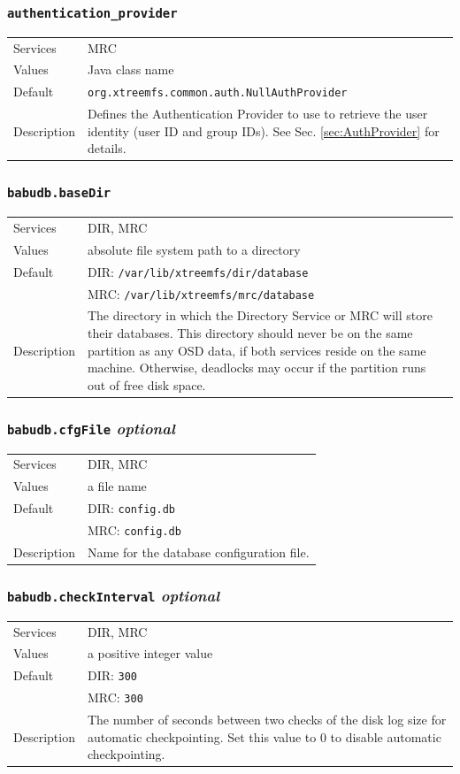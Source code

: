 \documentclass[a4paper,10pt]{book}
\begin{document}
\subsubsection{\texttt{authentication\_provider}}
\begin{tabular}{lp{10cm}}
 Services & MRC\\
 Values   & Java class name \\
 Default  & \texttt{org.xtreemfs.common.auth.NullAuthProvider}\\
 Description & Defines the Authentication Provider to use to retrieve the user identity (user ID and group IDs). See Sec. \ref{sec:AuthProvider} for details.
\end{tabular}

\subsubsection{\texttt{babudb.baseDir}}
\begin{tabular}{lp{10cm}}
 Services & DIR, MRC\\
 Values   & absolute file system path to a directory\\
 Default  & DIR: \texttt{/var/lib/xtreemfs/dir/database}\\
          & MRC: \texttt{/var/lib/xtreemfs/mrc/database}\\
 Description & The directory in which the Directory Service or MRC will store their databases. This directory should never be on the same partition as any OSD data, if both services reside on the same machine. Otherwise, deadlocks may occur if the partition runs out of free disk space.
\end{tabular}

\subsubsection{\texttt{babudb.cfgFile} \textit{optional}}
\begin{tabular}{lp{10cm}}
 Services & DIR, MRC\\
 Values   & a file name\\
 Default  & DIR: \texttt{config.db}\\
          & MRC: \texttt{config.db}\\
 Description & Name for the database configuration file.
\end{tabular}

\subsubsection{\texttt{babudb.checkInterval} \textit{optional}}
\begin{tabular}{lp{10cm}}
 Services & DIR, MRC\\
 Values   & a positive integer value\\
 Default  & DIR: \texttt{300}\\
          & MRC: \texttt{300}\\
 Description & The number of seconds between two checks of the disk log size for automatic checkpointing. Set this value to 0 to disable automatic checkpointing. 
\end{tabular}
\end{document}
